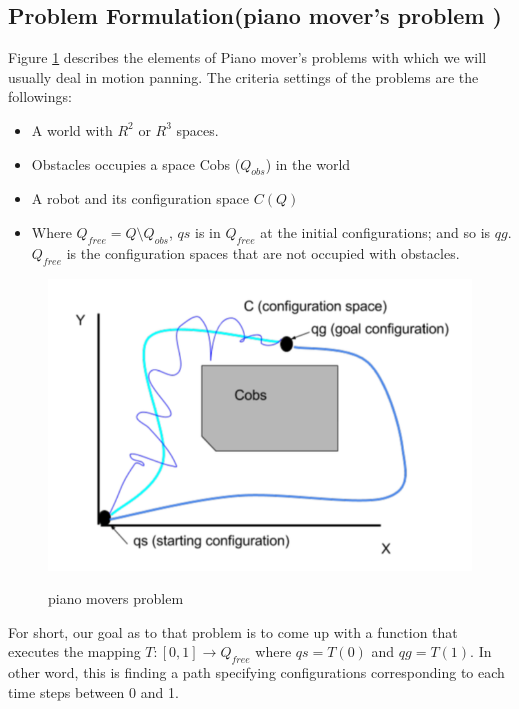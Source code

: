 \documentclass[11pt]{article}
\begin{document}
\subsection{Problem Formulation(piano mover's problem )}
Figure \ref{fig:pmp} describes the elements of Piano mover’s problems with which we will usually deal in motion panning. The criteria settings of the problems are the followings:
\begin{itemize}
\item A world with $R^2$ or $R^3$ spaces.  
\item Obstacles occupies a space Cobs ($Q_{obs}$) in the world
\item A robot and its configuration space $C(Q)$ 
\item Where $Q_{free} = Q\setminus Q_{obs}$, $qs$ is in $Q_{free}$ at the initial configurations; and so is $qg$. $Q_{free}$ is the configuration spaces that are not occupied with obstacles. 
\end{itemize}
\begin{figure}[h]
  \centering
  \includegraphics[width=12cm]{piano_movers_problem.png}
  \label{fig:pmp}
  \caption{piano movers problem}
\end{figure}
For short, our goal as to that problem is to come up with a function that executes the mapping $T:[0, 1] \rightarrow Q_{free}$ where $qs = T(0)$ and $qg = T(1)$. In other word, this is finding a path specifying configurations corresponding to each time steps between 0 and 1. 
\end{document}
